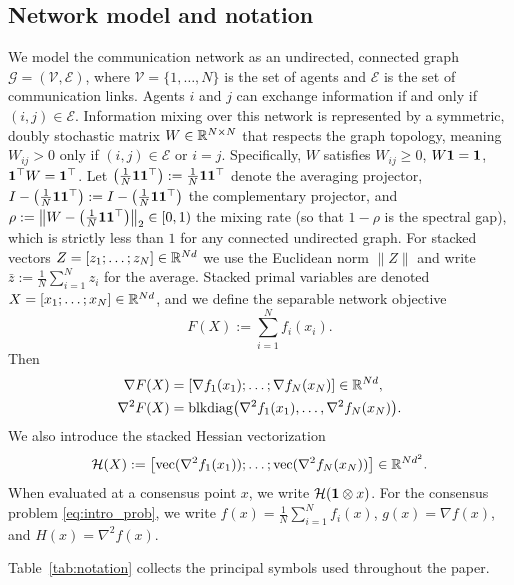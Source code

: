 \documentclass[review,onefignum,onetabnum]{siamart171218}
\begin{document}
	\subsection{Network model and notation}
	We model the communication network as an undirected, connected
	graph $\mathcal{G} = (\mathcal{V}, \mathcal{E})$, where
	$\mathcal{V} = \{1, \dots, N\}$ is the set of agents and
	$\mathcal{E}$ is the set of communication links.
	Agents $i$ and $j$ can exchange information if and only if
	$(i,j) \in \mathcal{E}$.
	Information mixing over this network is represented by a symmetric,
	doubly stochastic matrix $W \in \mathbb{R}^{N \times N}$ that respects
	the graph topology, meaning $W_{ij} > 0$ only if
	$(i,j) \in \mathcal{E}$ or $i=j$.
	Specifically, $W$ satisfies
	$W_{ij}\ge0$, $W\mathbf{1}=\mathbf{1}$, $\mathbf{1}^\top W=\mathbf{1}^\top$.
	Let $\left(\frac{1}{N}\mathbf{1}\mathbf{1}^\top\right):=\frac{1}{N}\mathbf{1}\mathbf{1}^\top$ denote the averaging projector,
	$I-\left(\frac{1}{N}\mathbf{1}\mathbf{1}^\top\right):=I-\left(\frac{1}{N}\mathbf{1}\mathbf{1}^\top\right)$ the complementary projector, and
	$\rho := \left\|W-\left(\frac{1}{N}\mathbf{1}\mathbf{1}^\top\right)\right\|_2\in[0,1)$ the mixing rate (so that $1{-}\rho$ is the spectral gap), which is
	strictly less than $1$ for any connected undirected graph.
	For stacked vectors $Z=[z_1;\dots;z_N]\in\mathbb{R}^{Nd}$ we use the
	Euclidean norm $\|Z\|$ and write $\bar z:=\frac1N\sum_{i=1}^N z_i$
	for the average.
	Stacked primal variables are denoted
	$X=[x_1;\dots;x_N]\in\mathbb{R}^{Nd}$, and we define the separable
	network objective
	\[
	F(X):=\sum_{i=1}^N f_i(x_i).
	\]
	Then
	\begin{align*}
	\nabla F(X)&=[\nabla f_1(x_1);\dots;\nabla f_N(x_N)]\in\mathbb{R}^{Nd},\\
	\nabla^2 F(X)&=\mathrm{blkdiag}\bigl(\nabla^2 f_1(x_1),\dots,\nabla^2 f_N(x_N)\bigr).
	\end{align*}
	We also introduce the stacked Hessian vectorization
	\[
	\mathcal H(X):=\bigl[\mathrm{vec}(\nabla^2 f_1(x_1));\dots;\mathrm{vec}(\nabla^2 f_N(x_N))\bigr]\in\mathbb{R}^{Nd^2}.
	\]
	When evaluated at a consensus point $x$, we write $\mathcal H(\mathbf{1}\otimes x)$.
	For the consensus problem \eqref{eq:intro_prob}, we write
	$f(x)=\frac1N\sum_{i=1}^N f_i(x)$, $g(x)=\nabla f(x)$, and $H(x)=\nabla^2 f(x)$.
	
	Table~\ref{tab:notation} collects the principal symbols used
	throughout the paper.
	
\end{document}
